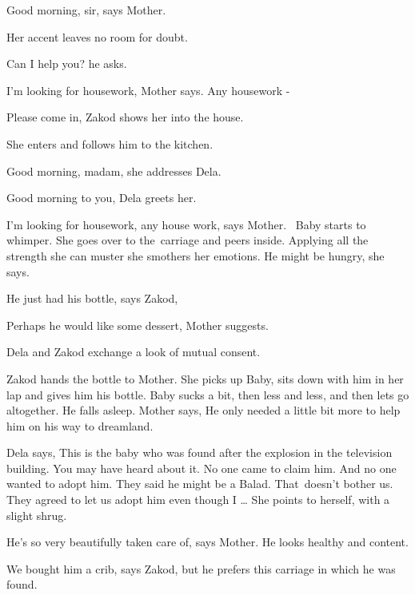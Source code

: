 \documentclass[12pt]{book}
\begin{document}
{\textquotedbl}Good morning, sir,{\textquotedbl} says Mother.

Her accent leaves no room for doubt.

{\textquotedbl}Can I help you?{\textquotedbl} he asks.

{\textquotedbl}I'm looking for housework,{\textquotedbl} Mother says. {\textquotedbl}Any housework -{\textquotedbl}

{\textquotedbl}Please come in,{\textquotedbl} Zakod shows her into the house.

She enters and follows him to the kitchen.

{\textquotedbl}Good morning, madam,{\textquotedbl} she addresses Dela.

{\textquotedbl}Good morning to you,{\textquotedbl} Dela greets her.

{\textquotedbl}I'm looking for housework, any house work,{\textquotedbl} says Mother. \ Baby starts to whimper. She goes
over to the~carriage and peers inside. Applying all the strength she can muster she smothers her emotions.
{\textquotedbl}He might be hungry,{\textquotedbl} she says.

{\textquotedbl}He just had his bottle,{\textquotedbl} says Zakod,

{\textquotedbl}Perhaps he would like some dessert,{\textquotedbl} Mother suggests.

Dela and Zakod exchange a look of mutual consent.

Zakod hands the bottle to Mother. She picks up Baby, sits down with him in her lap and gives him his bottle. Baby sucks
a bit, then less and less, and then lets go altogether. He falls asleep. Mother says, {\textquotedbl}He only needed a
little bit more to help him on his way to dreamland.{\textquotedbl}

Dela says, {\textquotedbl}This is the baby who was found after the explosion in the television building. You may have
heard about it. No one came to claim him. And no one wanted to adopt him. They said he might be a Balad. That~doesn't
bother us. They agreed to let us adopt him even though I {\dots}{\textquotedbl} She points to herself, with a slight
shrug.

{\textquotedbl}He's so very beautifully taken care of,{\textquotedbl} says Mother. {\textquotedbl}He looks healthy and
content.{\textquotedbl}

{\textquotedbl}We bought him a crib,{\textquotedbl} says Zakod, {\textquotedbl}but he prefers this carriage in which he
was found.{\textquotedbl}
\end{document}
